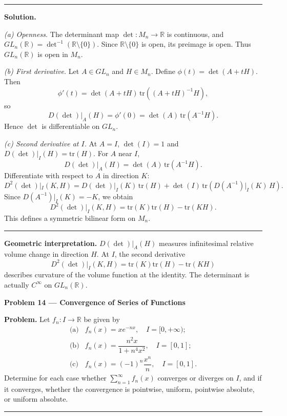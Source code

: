 \documentclass[12pt,a4paper]{article}
\theoremstyle{plain}
\theoremstyle{definition}
\theoremstyle{remark}
\theoremstyle{remark}
\newcommand{\probheader}[1]{%
	\par\vspace{8pt}%
	{\Large\bfseries #1\par}%
	\vspace{6pt}%
}
\newcommand{\sep}{\vspace{6pt}\hrule\vspace{8pt}}
\begin{document}
	\sep
	
	\textbf{Solution.}
	
	\textit{(a) Openness.}
	The determinant map $\det:M_n\to\mathbb{R}$ is continuous,
	and $GL_n(\mathbb{R})=\det^{-1}(\mathbb{R}\setminus\{0\})$.
	Since $\mathbb{R}\setminus\{0\}$ is open, its preimage is open.
	Thus $GL_n(\mathbb{R})$ is open in $M_n$.
	
	\medskip
	
	\textit{(b) First derivative.}
	Let $A\in GL_n$ and $H\in M_n$.
	Define $\phi(t)=\det(A+tH)$.
	Then
	\[
	\phi'(t)=\det(A+tH)\,\mathrm{tr}((A+tH)^{-1}H),
	\]
	so
	\[
	D(\det)|_A(H)=\phi'(0)
	=\det(A)\,\mathrm{tr}(A^{-1}H).
	\]
	Hence $\det$ is differentiable on $GL_n$.
	
	\medskip
	
	\textit{(c) Second derivative at $I$.}
	At $A=I$, $\det(I)=1$ and $D(\det)|_I(H)=\mathrm{tr}(H)$.
	For $A$ near $I$,
	\[
	D(\det)|_A(H)=\det(A)\,\mathrm{tr}(A^{-1}H).
	\]
	Differentiate with respect to $A$ in direction $K$:
	\[
	D^2(\det)|_I(K,H)
	= D(\det)|_I(K)\,\mathrm{tr}(H)
	+ \det(I)\,\mathrm{tr}(D(A^{-1})|_I(K)\,H).
	\]
	Since $D(A^{-1})|_I(K)=-K$, we obtain
	\[
	D^2(\det)|_I(K,H)=\mathrm{tr}(K)\mathrm{tr}(H)-\mathrm{tr}(KH).
	\]
	This defines a symmetric bilinear form on $M_n$.
	
	\sep
	
	\textbf{Geometric interpretation.}
	$D(\det)|_A(H)$ measures infinitesimal relative volume change in direction $H$.
	At $I$, the second derivative
	\[
	D^2(\det)|_I(K,H)=\mathrm{tr}(K)\mathrm{tr}(H)-\mathrm{tr}(KH)
	\]
	describes curvature of the volume function at the identity.
	The determinant is actually $C^\infty$ on $GL_n(\mathbb{R})$.
	
	\probheader{Problem 14 — Convergence of Series of Functions}
	
	\textbf{Problem.}
	Let $f_n:I\to\mathbb{R}$ be given by
	\[
	\begin{array}{ll}
		\text{(a)} & f_n(x)=x e^{-nx},\quad I=[0,+\infty);\\[3pt]
		\text{(b)} & f_n(x)=\dfrac{n^2x}{1+n^4x^2},\quad I=[0,1];\\[10pt]
		\text{(c)} & f_n(x)=(-1)^n\dfrac{x^n}{n},\quad I=[0,1].
	\end{array}
	\]
	Determine for each case whether $\sum_{n=1}^\infty f_n(x)$ converges or diverges on $I$,
	and if it converges, whether the convergence is pointwise, uniform,
	pointwise absolute, or uniform absolute.
	
	\sep
	
\end{document}
